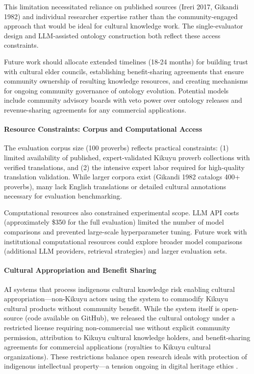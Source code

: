 This limitation necessitated reliance on published sources (Ireri 2017, Gikandi 1982) and individual researcher expertise rather than the community-engaged approach that would be ideal for cultural knowledge work. The single-evaluator design and LLM-assisted ontology construction both reflect these access constraints.

Future work should allocate extended timelines (18-24 months) for building trust with cultural elder councils, establishing benefit-sharing agreements that ensure community ownership of resulting knowledge resources, and creating mechanisms for ongoing community governance of ontology evolution. Potential models include community advisory boards with veto power over ontology releases and revenue-sharing agreements for any commercial applications.

\paragraph{Resource Constraints: Corpus and Computational Access}

The evaluation corpus size (100 proverbs) reflects practical constraints: (1) limited availability of published, expert-validated Kikuyu proverb collections with verified translations, and (2) the intensive expert labor required for high-quality translation validation. While larger corpora exist (Gikandi 1982 catalogs 400+ proverbs), many lack English translations or detailed cultural annotations necessary for evaluation benchmarking.

Computational resources also constrained experimental scope. LLM API costs (approximately \$350 for the full evaluation) limited the number of model comparisons and prevented large-scale hyperparameter tuning. Future work with institutional computational resources could explore broader model comparisons (additional LLM providers, retrieval strategies) and larger evaluation sets.

\paragraph{Cultural Appropriation and Benefit Sharing}

AI systems that process indigenous cultural knowledge risk enabling cultural appropriation—non-Kikuyu actors using the system to commodify Kikuyu cultural products without community benefit. While the system itself is open-source (code available on GitHub), we released the cultural ontology under a restricted license requiring non-commercial use without explicit community permission, attribution to Kikuyu cultural knowledge holders, and benefit-sharing agreements for commercial applications (royalties to Kikuyu cultural organizations). These restrictions balance open research ideals with protection of indigenous intellectual property—a tension ongoing in digital heritage ethics \citep{christen2012does}.


